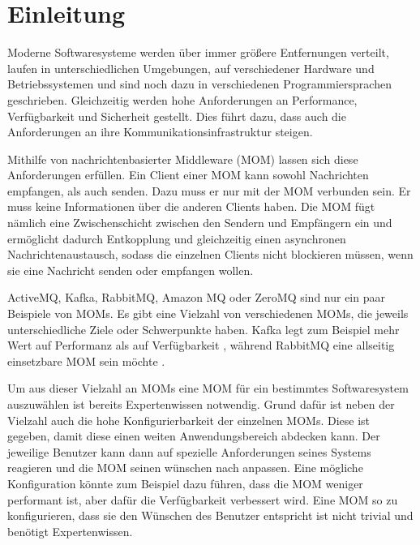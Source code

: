 
\chapter{Einleitung}
\label{ch:Introduction}
Moderne Softwaresysteme werden über immer größere Entfernungen verteilt, laufen in unterschiedlichen Umgebungen, auf verschiedener Hardware und Betriebssystemen und sind noch dazu in verschiedenen Programmiersprachen geschrieben. Gleichzeitig werden hohe Anforderungen an Performance, Verfügbarkeit und Sicherheit gestellt. Dies führt dazu, dass auch die Anforderungen an ihre Kommunikationsinfrastruktur steigen. \par
Mithilfe von nachrichtenbasierter Middleware (MOM) lassen sich diese Anforderungen erfüllen. Ein Client einer MOM kann sowohl Nachrichten empfangen, als auch senden. Dazu muss er nur mit der MOM verbunden sein. Er muss keine Informationen über die anderen Clients haben. Die MOM fügt nämlich eine Zwischenschicht zwischen den Sendern und Empfängern ein und ermöglicht dadurch Entkopplung und gleichzeitig einen asynchronen Nachrichtenaustausch, sodass die einzelnen Clients nicht blockieren müssen, wenn sie eine Nachricht senden oder empfangen wollen. \par
ActiveMQ, Kafka, RabbitMQ, Amazon MQ oder ZeroMQ sind nur ein paar Beispiele von MOMs. Es gibt eine Vielzahl von verschiedenen MOMs, die jeweils unterschiedliche Ziele oder Schwerpunkte haben. Kafka legt zum Beispiel mehr Wert auf Performanz als auf Verfügbarkeit \cite{kafka}, während RabbitMQ eine allseitig einsetzbare MOM sein möchte \cite{rabbitmq}. \par
Um aus dieser Vielzahl an MOMs eine MOM für ein bestimmtes Softwaresystem auszuwählen ist bereits Expertenwissen notwendig. Grund dafür ist neben der Vielzahl auch die hohe Konfigurierbarkeit der einzelnen MOMs. Diese ist gegeben, damit diese einen weiten Anwendungsbereich abdecken kann. Der jeweilige Benutzer kann dann auf spezielle Anforderungen seines Systems reagieren und die MOM seinen wünschen nach anpassen. Eine mögliche Konfiguration könnte zum Beispiel dazu führen, dass die MOM weniger performant ist, aber dafür die Verfügbarkeit verbessert wird. Eine MOM so zu konfigurieren, dass sie den Wünschen des Benutzer entspricht ist nicht trivial und benötigt Expertenwissen. 

